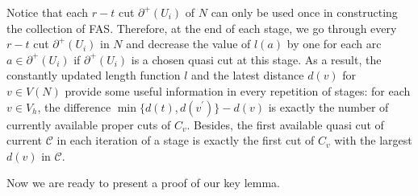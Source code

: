 \documentclass[11pt]{article}
\begin{document}
Notice that each $r-t$ cut $\partial^+(U_i)$ of $N$ can only be used once in constructing the collection of FAS. Therefore, at the end of each stage, we go through every $r-t$ cut $\partial^+(U_i)$ in $N$ and decrease the value of $l(a)$ by one for each arc $a\in \partial^+(U_i)$ if $\partial^+(U_i)$ is a chosen quasi cut at this stage. As a result, the constantly updated length function $l$ and the latest distance $d(v)$ for $v\in V(N)$ provide some useful information in every repetition of stages: for each $v\in V_h$, the difference $\min\{d(t),d(v^\prime)\}-d(v)$ is exactly the number of currently available proper cuts of $C_v$. Besides, the first available quasi cut of current $\mathcal{C}$ in each iteration of a stage is exactly the first cut of $C_v$ with the largest $d(v)$ in $\mathcal{C}$.

Now we are ready to present a proof of our key lemma.
\end{document}
